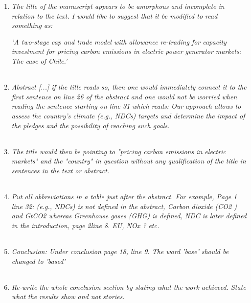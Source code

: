 \documentclass[a4paper]{amsart}
\theoremstyle{plain}
\theoremstyle{definition}
\theoremstyle{remark}
\numberwithin{equation}{section}
\begin{document}
\begin{enumerate}

\item \emph{The title of the manuscript appears to be amorphous and incomplete in relation to the text. I would like to suggest that it be modified to read something as:}

\emph{'A two-stage cap and trade model with allowance re-trading for capacity investment for pricing carbon emissions in electric power generator markets: The case of Chile.'}\\

{\color{blue}{details.}}\\

\item \emph{Abstract [...] if the title reads so, then one would immediately connect it to the first sentence on line 26 of the abstract and one would not be worried when reading the sentence starting on line 31 which reads: Our approach allows to assess the country's climate
(e.g., NDCs) targets and determine the impact of the pledges and the possibility of reaching such
goals.}\\

{\color{blue}{details.}}\\


\item \emph{The title would then be pointing to "pricing carbon emissions in electric markets" and the "country" in question without any qualification of the title in sentences in the text or abstract.}\\

{\color{blue}{details.}}\\

\item \emph{Put all abbreviations in a table just after the abstract. For example, Page 1 line 32: (e.g., NDCs) is not defined in the abstract, Carbon dioxide (CO2 ) and GtCO2 whereas Greenhouse gases (GHG) is defined, NDC is later defined in the introduction, page 2line 8. EU, NOx ? etc.}\\

{\color{blue}{details.}}\\

\item \emph{Conclusion: Under conclusion page 18, line 9. The word 'base' should be changed to 'based'}\\

{\color{blue}{details.}}\\

\item \emph{Re-write the whole conclusion section by stating what the work achieved. State what the results show and not stories.}\\

{\color{blue}{details.}}\\

\end{enumerate}
\end{document}
